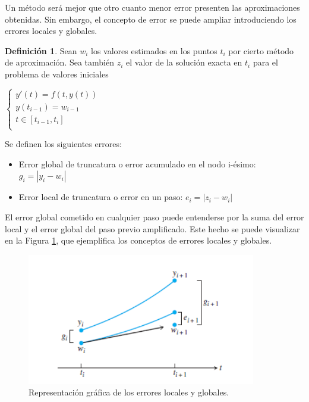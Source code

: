 \documentclass{article}
\theoremstyle{theorem-style}  %
\theoremstyle{definition}
\newtheorem{definition}{Definición}[section]
\theoremstyle{example-style}
\begin{document}
	Un método será mejor que otro cuanto menor error presenten las aproximaciones obtenidas. Sin embargo, el concepto de error se puede ampliar introduciendo los errores locales y globales.
	
	\begin{definition} 
		Sean $w_i$ los valores estimados en los puntos $t_i$ por cierto método de aproximación. Sea también $z_i$ el valor de la solución exacta en $t_i$ para el problema de valores iniciales
		
		\begin{center}
			$\begin{cases}
			y'(t) = f(t,y(t)) \\
			y(t_{i-1}) = w_{i-1} \\
			t \in [t_{i-1},t_{i}] \\
			\end{cases}$
		\end{center}

		Se definen los siguientes errores:
	
		\begin{itemize}
			\item Error global de truncatura o error acumulado en el nodo i-ésimo: $g_i=|y_i - w_i|$
			\item Error local de truncatura o error en un paso: $e_i = |z_i - w_i|$
		\end{itemize} 
	\end{definition}
	
	El error global cometido en cualquier paso puede entenderse por la suma del error local y el error global del paso previo amplificado. Este hecho se puede visualizar en la Figura \ref{fig:error}, que ejemplifica los conceptos de errores locales y globales.
		
	\begin{figure}[h]
		\centering
		\includegraphics[width=10cm]{./Images/error-euler.png}
		\caption{Representación gráfica de los errores locales y globales.} 
		\label{fig:error}
	\end{figure}
	
\end{document}
